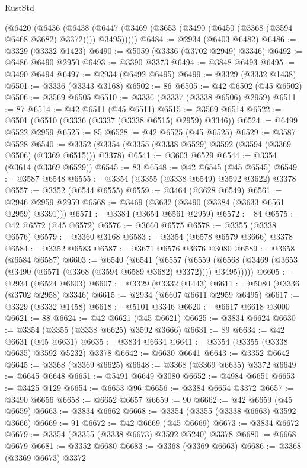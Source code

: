 \begin{lexlean}{RustStd}
\begin{coremodule}
    (@6420
      (@6436
        (@6438 (@6447 (@3469 (@3653 (@3490 (@6450 (@3368 (@3594 @6468 @3682) @3372)))) @3495)))))
@6484 := @2934 (@6403 @6482)
@6486 := @3329 (@3332 @1423)
@6490 := @5059 (@3336 (@3702 @2949) @3346)
@6492 := @6486 @6490 @2950
@6493 := @3390 @3373
@6494 := @3848 @6493
@6495 := @3490 @6494
@6497 := @2934 (@6492 @6495)
@6499 := @3329 (@3332 @1438)
@6501 := @3336 (@3343 @3168)
@6502 := 86
@6505 := @42 @6502 (@45 @6502)
@6506 := @3569 @6505
@6510 := @3336 (@3337 (@3338 @6506) @2959)
@6511 := 87
@6514 := @42 @6511 (@45 @6511)
@6515 := @3569 @6514
@6522 := @6501 (@6510 (@3336 (@3337 (@3338 @6515) @2959) @3346))
@6524 := @6499 @6522 @2959
@6525 := 85
@6528 := @42 @6525 (@45 @6525)
@6529 := @3587 @6528
@6540 := @3352 (@3354 (@3355 (@3338 @6529) @3592 (@3594 (@3369 @6506) (@3369 @6515))) @3378)
@6541 := @3603 @6529
@6544 := @3354 (@3614 (@3369 @6529))
@6545 := 83
@6548 := @42 @6545 (@45 @6545)
@6549 := @3587 @6548
@6555 := @3354 (@3355 (@3338 @6549) @3592 @3622) @3378
@6557 := @3352 (@6544 @6555)
@6559 := @3464 (@3628 @6549)
@6561 := @2946 @2959 @2959
@6568 := @3469 (@3632 (@3490 (@3384 (@3633 @6561 @2959) @3391)))
@6571 := @3384 (@3654 @6561 @2959)
@6572 := 84
@6575 := @42 @6572 (@45 @6572)
@6576 := @3660 @6575
@6578 := @3355 (@3338 @6576)
@6579 := @3360 @3168
@6583 := @3354 (@6578 @6579 @3666) @3378
@6584 := @3352 @6583
@6587 := @3671 @6576 @3676 @3080
@6589 := @3658 (@6584 @6587)
@6603 := @6540
    (@6541
      (@6557
        (@6559 (@6568 (@3469 (@3653 (@3490 (@6571 (@3368 (@3594 @6589 @3682) @3372)))) @3495)))))
@6605 := @2934 (@6524 @6603)
@6607 := @3329 (@3332 @1443)
@6611 := @5080 (@3336 (@3702 @2958) @3346)
@6615 := @2934 (@6607 @6611 @2959 @6495)
@6617 := @3329 (@3332 @1458)
@6618 := @5101 @3346
@6620 := @6617 @6618 @3000
@6621 := 88
@6624 := @42 @6621 (@45 @6621)
@6625 := @3834 @6624
@6630 := @3354 (@3355 (@3338 @6625) @3592 @3666)
@6631 := 89
@6634 := @42 @6631 (@45 @6631)
@6635 := @3834 @6634
@6641 := @3354 (@3355 (@3338 @6635) @3592 @5232) @3378
@6642 := @6630 @6641
@6643 := @3352 @6642
@6645 := @3368 (@3369 @6625)
@6648 := @3368 (@3369 @6635) @3372
@6649 := @6645 @6648
@6651 := @5491 @6649 @3080
@6652 := @4984 @6651
@6653 := @3425 @129
@6654 := @6653 @96
@6656 := @3384 @6654 @3372
@6657 := @3490 @6656
@6658 := @6652 @6657
@6659 := 90
@6662 := @42 @6659 (@45 @6659)
@6663 := @3834 @6662
@6668 := @3354 (@3355 (@3338 @6663) @3592 @3666)
@6669 := 91
@6672 := @42 @6669 (@45 @6669)
@6673 := @3834 @6672
@6679 := @3354 (@3355 (@3338 @6673) @3592 @5240) @3378
@6680 := @6668 @6679
@6681 := @3352 @6680
@6683 := @3368 (@3369 @6663)
@6686 := @3368 (@3369 @6673) @3372

\end{coremodule}
\end{lexlean}
